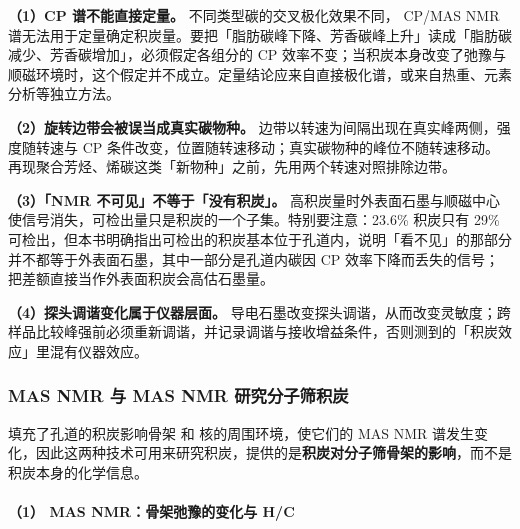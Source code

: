 \begin{pitfall}
\textbf{（1）CP 谱不能直接定量。} 不同类型碳的交叉极化效果不同， CP/MAS NMR 谱无法用于定量确定积炭量。要把「脂肪碳峰下降、芳香碳峰上升」读成「脂肪碳减少、芳香碳增加」，必须假定各组分的 CP 效率不变；当积炭本身改变了弛豫与顺磁环境时，这个假定并不成立。定量结论应来自直接极化谱，或来自热重、元素分析等独立方法。

\textbf{（2）旋转边带会被误当成真实碳物种。} 边带以转速为间隔出现在真实峰两侧，强度随转速与 CP 条件改变，位置随转速移动；真实碳物种的峰位不随转速移动。再现聚合芳烃、烯碳这类「新物种」之前，先用两个转速对照排除边带。

\textbf{（3）「NMR 不可见」不等于「没有积炭」。} 高积炭量时外表面石墨与顺磁中心使信号消失，可检出量只是积炭的一个子集。特别要注意：23.6\% 积炭只有 29\% 可检出，但本书明确指出可检出的积炭基本位于孔道内，说明「看不见」的那部分并不都等于外表面石墨，其中一部分是孔道内碳因 CP 效率下降而丢失的信号；把差额直接当作外表面积炭会高估石墨量。

\textbf{（4）探头调谐变化属于仪器层面。} 导电石墨改变探头调谐，从而改变灵敏度；跨样品比较峰强前必须重新调谐，并记录调谐与接收增益条件，否则测到的「积炭效应」里混有仪器效应。
\end{pitfall}

\subsubsection{ MAS NMR 与  MAS NMR 研究分子筛积炭}

填充了孔道的积炭影响骨架  和  核的周围环境，使它们的 MAS NMR 谱发生变化，因此这两种技术可用来研究积炭，提供的是\textbf{积炭对分子筛骨架的影响}，而不是积炭本身的化学信息。

\paragraph{（1） MAS NMR：骨架弛豫的变化与 H/C}


